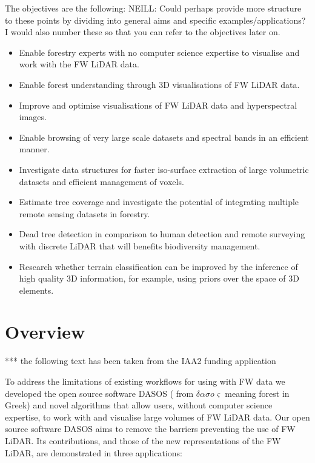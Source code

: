 \documentclass{subfiles}
\begin{document}
\par The objectives are the following:
{\color{red} NEILL: Could perhaps provide more structure to these points by dividing into general aims and specific examples/applications? I would also number these so that you can refer to the objectives later on. }
\begin{itemize}
	\item Enable forestry experts with no computer science expertise to visualise and work with the FW LiDAR data. 
	\item Enable forest understanding through 3D visualisations of FW LiDAR data.
	\item Improve and optimise visualisations of FW LiDAR data and hyperspectral images.
	\item Enable browsing of very large scale datasets and spectral bands in an efficient manner.
	\item Investigate data structures for faster iso-surface extraction of large volumetric datasets and efficient management of voxels.
	\item Estimate tree coverage and investigate the potential of integrating multiple remote sensing datasets in forestry.
	\item Dead tree detection in comparison to human detection and remote surveying with discrete LiDAR that will benefits biodiversity management.
	\item Research whether terrain classification can be improved by the inference of high quality 3D information, for example, using priors over the space of 3D elements.
	
	
\end{itemize}

\section{Overview}

\par {\color{red} *** the following text has been taken from the IAA2 funding application}
	
\par To address the limitations of existing workflows for using with FW data we developed the open source software DASOS ( from $\delta \alpha \sigma o \varsigma$ meaning forest in Greek) and novel algorithms that allow users, without computer science expertise, to work with and visualise large volumes of FW LiDAR data. Our open source software DASOS aims to remove the barriers preventing the use of FW LiDAR. Its contributions, and those of the new representations of the FW LiDAR, are demonstrated in three applications:
\end{document}
